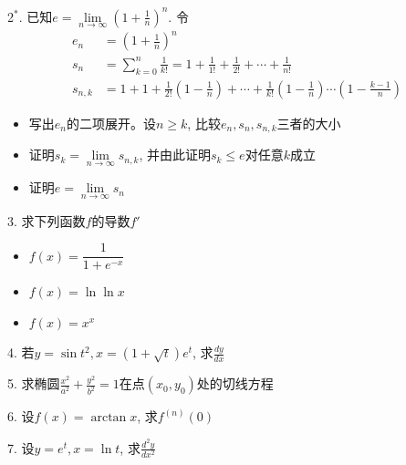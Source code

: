 \documentclass[10pt]{beamer}
\begin{document}

\begin{frame}

2$^*$. 已知$e = \lim\limits_{n\to\infty} \left(1+\frac{1}{n}\right)^n$. 令
\begin{align*}
e_n & = \left(1+\frac{1}{n}\right)^n \\
s_n & = \sum\limits_{k=0}^n \frac{1}{k!} = 1 + \frac{1}{1!} + \frac{1}{2!} + \cdots + \frac{1}{n!} \\
s_{n,k} & = 1 + 1 + \frac{1}{2!}\left( 1-\frac{1}{n} \right) + \cdots + \frac{1}{k!}\left( 1-\frac{1}{n} \right)\cdots \left( 1-\frac{k-1}{n} \right)
\end{align*}
\begin{itemize}
\item[(1)] 写出$e_n$的二项展开。设$n\ge k$, 比较$e_n,s_n,s_{n,k}$三者的大小
\item[(2)] 证明$s_k = \lim\limits_{n\to\infty} s_{n,k}$, 并由此证明$s_k\le e$对任意$k$成立
\item[(3)] 证明$e=\lim\limits_{n\to\infty} s_n$
\end{itemize}

\end{frame}


\begin{frame}

3. 求下列函数$f$的导数$f'$
\begin{itemize}
\item[(1)] $f(x) = \dfrac{1}{1+e^{-x}}$
\item[(2)] $f(x) = \ln\ln x$
\item[(3)] $f(x) = x^x$
\end{itemize}

\vspace{1em}

4. 若$y = \sin t^2, x = (1 + \sqrt{t})e^t$, 求$\frac{dy}{dx}$

\vspace{1em}

5. 求椭圆$\frac{x^2}{a^2} + \frac{y^2}{b^2} = 1$在点$(x_0,y_0)$处的切线方程

\vspace{1em}

6. 设$f(x) = \arctan x$, 求$f^{(n)}(0)$

\vspace{1em}

7. 设$y = e^t, x = \ln t$, 求$\frac{d^2y}{dx^2}$

\end{frame}
\end{document}
